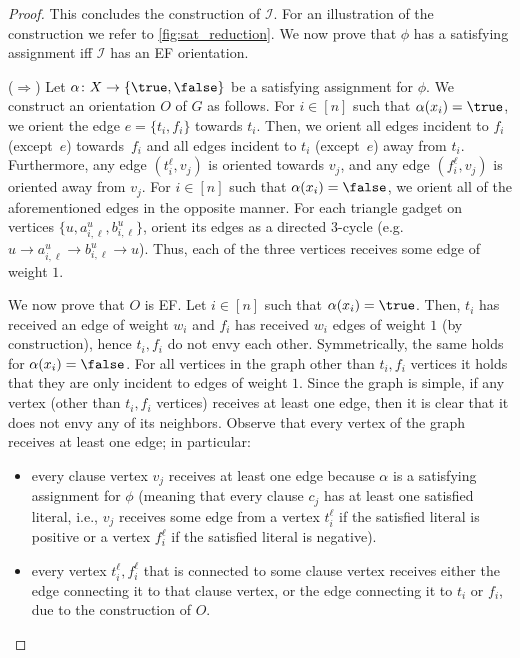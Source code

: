 \documentclass[11pt,letterpaper]{article}
\begin{document}
\begin{proof}
    This concludes the construction of $\mathcal{I}$.
    For an illustration of the construction we refer to \cref{fig:sat_reduction}. We now prove that $\phi$ has a satisfying assignment iff $\mathcal{I}$ has an EF orientation.


    ($\Rightarrow$) Let $\alpha \colon X \to \{\true, \false\}$ be a satisfying assignment for $\phi$. We construct an orientation $O$ of $G$ as follows.
    For $i \in [n]$ such that $\alpha(x_i)=\true$, we orient the edge
    $e=\{t_i,f_i\}$ towards $t_i$. Then, we orient all edges incident to $f_i$ (except~$e$) towards~$f_i$ and all edges incident to $t_i$ (except~$e$) away from $t_i$.
    Furthermore, any edge $(t_i^\ell,v_j)$ is oriented towards $v_j$, and any edge $(f_i^\ell,v_j)$ is oriented away from $v_j$.
    For $i \in [n]$ such that $\alpha(x_i)=\false$, we orient all of the aforementioned edges in the opposite manner.
    For each triangle gadget on vertices  $\{u,a_{i,\ell}^u,b_{i,\ell}^u\}$, orient its edges as a directed $3$-cycle (e.g. $u \to a_{i,\ell}^u \to b_{i,\ell}^u \to u$). Thus, each of the three vertices receives some edge of weight $1$.

    We now prove that $O$ is EF. Let $i \in [n]$ such that $\alpha(x_i)=\true$. Then, $t_i$ has received an edge of weight $w_i$ and $f_i$ has received $w_i$ edges of weight $1$ (by construction), hence $t_i, f_i$ do not envy each other. Symmetrically, the same holds for $\alpha(x_i)=\false$.
    For all vertices in the graph other than $t_i, f_i$ vertices it holds that they are only incident to edges of weight $1$. Since the graph is simple, if any vertex (other than $t_i, f_i$ vertices) receives at least one edge, then it is clear that it does not envy any of its neighbors. Observe that every vertex of the graph receives at least one edge; in particular:

    \begin{itemize}
        \item every clause vertex $v_j$ receives at least one edge because $\alpha$ is a satisfying assignment for $\phi$ (meaning that every clause $c_j$ has at least one satisfied literal, i.e., $v_j$ receives some edge from a vertex $t_i^\ell$ if the satisfied literal is positive or a vertex $f_i^\ell$ if the satisfied literal is negative).

        \item every vertex $t_i^\ell, f_i^\ell$ that is connected to some clause vertex receives either the edge connecting it to that clause vertex, or the edge connecting it to $t_i$ or $f_i$, due to the construction of $O$.


\end{itemize}
\end{proof}
\end{document}
